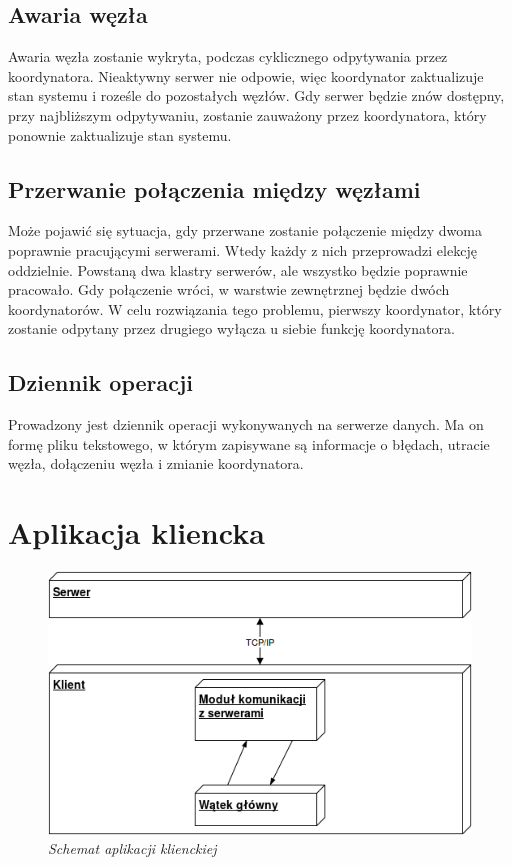 \subsection{Awaria węzła}
Awaria węzła zostanie wykryta, podczas cyklicznego odpytywania przez koordynatora. Nieaktywny serwer nie odpowie, więc koordynator zaktualizuje stan systemu i roześle do pozostałych węzłów. Gdy serwer będzie znów dostępny, przy najbliższym odpytywaniu, zostanie zauważony przez koordynatora, który ponownie zaktualizuje stan systemu.

\subsection{Przerwanie połączenia między węzłami}
Może pojawić się sytuacja, gdy przerwane zostanie połączenie między dwoma poprawnie pracującymi serwerami. Wtedy każdy z nich przeprowadzi elekcję oddzielnie. Powstaną dwa klastry serwerów, ale wszystko będzie poprawnie pracowało. Gdy połączenie wróci, w warstwie zewnętrznej będzie dwóch koordynatorów. W celu rozwiązania tego problemu, pierwszy koordynator, który zostanie odpytany przez drugiego wyłącza u siebie funkcję koordynatora.

\subsection{Dziennik operacji}
Prowadzony jest dziennik operacji wykonywanych na serwerze danych. Ma on formę pliku tekstowego, w którym zapisywane są informacje o błędach, utracie węzła, dołączeniu węzła i zmianie koordynatora.


\section{Aplikacja kliencka}

\begin{figure}[!h]
    \begin{center}
    \includegraphics[angle=0,scale=0.5]{img/client.png}
    \end{center}
    \caption{\em Schemat aplikacji klienckiej}
    \label{fig:client}
\end{figure}

